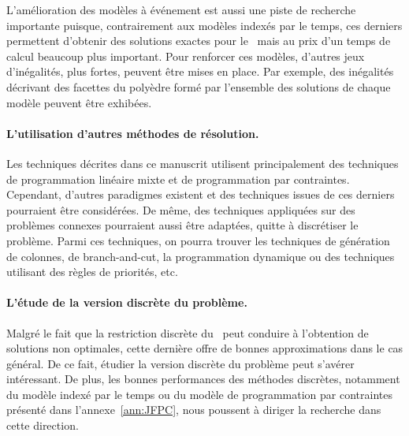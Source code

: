 L'amélioration des modèles à événement est aussi une piste de
recherche importante puisque, contrairement aux modèles indexés par le
temps, ces derniers permettent d'obtenir des solutions exactes pour le
\CECSP~mais au prix d'un temps de calcul beaucoup plus important. Pour
renforcer ces modèles, d'autres jeux d'inégalités, plus fortes,
peuvent être mises en place. Par exemple, des inégalités décrivant des
facettes du polyèdre formé par l'ensemble des solutions de chaque
modèle peuvent être exhibées.

\paragraph{L'utilisation d'autres méthodes de résolution.}
Les techniques décrites dans ce manuscrit utilisent principalement des
techniques de programmation linéaire mixte et de programmation par
contraintes. Cependant, d'autres paradigmes existent et des techniques
issues de ces derniers pourraient être considérées. De même, des
techniques appliquées sur des problèmes connexes pourraient aussi être
adaptées, quitte à discrétiser le problème. Parmi ces techniques, on
pourra trouver les techniques de génération de colonnes, de
branch-and-cut, la programmation dynamique ou des techniques utilisant
des règles de priorités, etc. 


\paragraph{L'étude de la version discrète du problème.} Malgré le fait
que la restriction discrète du \CECSP~peut conduire à l'obtention de
solutions non optimales, cette dernière offre de bonnes approximations
dans le cas général. De ce fait, étudier la version discrète du
problème peut s'avérer intéressant. De plus, les bonnes performances
des méthodes discrètes, notamment du modèle indexé par le temps ou du
modèle de programmation par contraintes présenté dans
l'annexe~\ref{ann:JFPC}, nous poussent à diriger la recherche dans
cette direction. 





